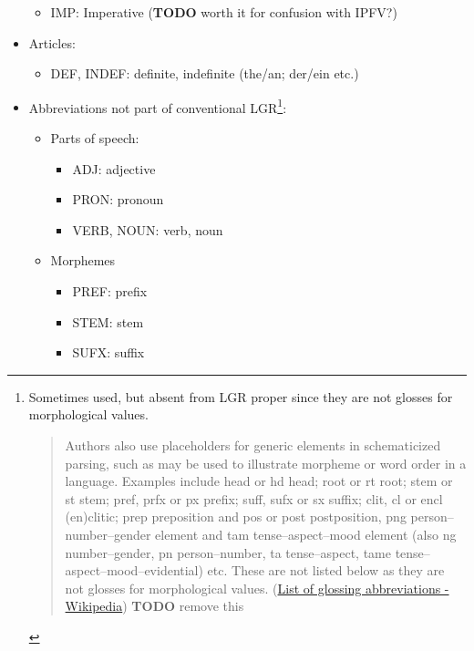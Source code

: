 \begin{itemize}
  \begin{itemize}
  \tightlist
  \item
    IMP: Imperative (\textbf{TODO} worth it for confusion with IPFV?)
  \end{itemize}
\item
  Articles:

  \begin{itemize}
  \tightlist
  \item
    DEF, INDEF: definite, indefinite (the/an; der/ein etc.)
  \end{itemize}
\item
  Abbreviations not part of conventional LGR\footnote{Sometimes used,
    but absent from LGR proper since they are not glosses for
    morphological values.

    \begin{quote}
    Authors also use placeholders for generic elements in schematicized
    parsing, such as may be used to illustrate morpheme or word order in
    a language. Examples include head or hd
    \textquotesingle head\textquotesingle; root or rt
    \textquotesingle root\textquotesingle; stem or st
    \textquotesingle stem\textquotesingle; pref, prfx or px
    \textquotesingle prefix\textquotesingle; suff, sufx or sx
    \textquotesingle suffix\textquotesingle; clit, cl or encl
    \textquotesingle(en)clitic\textquotesingle; prep
    \textquotesingle preposition\textquotesingle{} and pos or post
    \textquotesingle postposition\textquotesingle, png
    \textquotesingle person--number--gender element\textquotesingle{}
    and tam \textquotesingle tense--aspect--mood
    element\textquotesingle{} (also ng number--gender, pn
    person--number, ta tense--aspect, tame
    tense--aspect--mood--evidential) etc. These are not listed below as
    they are not glosses for morphological values.
    (\href{https://en.wikipedia.org/wiki/List_of_glossing_abbreviations}{List
    of glossing abbreviations - Wikipedia}) \textbf{TODO} remove this
    \end{quote}}:

  \begin{itemize}
  \tightlist
  \item
    Parts of speech:

    \begin{itemize}
    \tightlist
    \item
      ADJ: adjective
    \item
      PRON: pronoun
    \item
      VERB, NOUN: verb, noun
    \end{itemize}
  \item
    Morphemes

    \begin{itemize}
    \tightlist
    \item
      PREF: prefix
    \item
      STEM: stem
    \item
      SUFX: suffix
    \end{itemize}
  \end{itemize}
\end{itemize}

